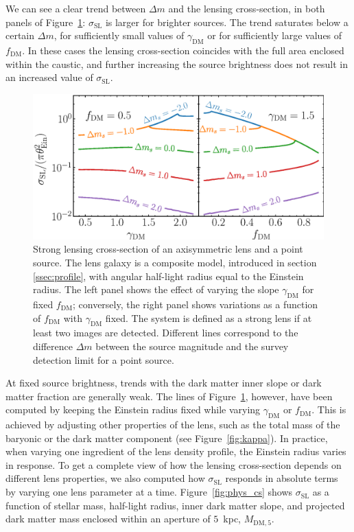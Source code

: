 \documentclass{aa}
\def\gammadm{\gamma_{\mathrm{DM}}}
\def\fdm{f_{\mathrm{DM}}}
\def\mdmfive{M_{\mathrm{DM}, 5}}
\def\crosssect{\sigma_\mathrm{{SL}}}
\def\Fref#1{Figure~\ref{#1}\xspace}
\begin{document}
We can see a clear trend between $\Delta m$ and the lensing cross-section, in both panels of \Fref{fig:fixedap_cs}: $\crosssect$ is larger for brighter sources.
The trend saturates below a certain $\Delta m$, for sufficiently small values of $\gammadm$ or for sufficiently large values of $\fdm$.
In these cases the lensing cross-section coincides with the full area enclosed within the caustic, and further increasing the source brightness does not result in an increased value of $\crosssect$.

\begin{figure}
\includegraphics[width=\columnwidth]{axisymm_composite_crosssect.eps}
\caption{
Strong lensing cross-section of an axisymmetric lens and a point source.
The lens galaxy is a composite model, introduced in section \ref{ssec:profile}, with angular half-light radius equal to the Einstein radius.
The left panel shows the effect of varying the slope $\gammadm$ for fixed $\fdm$; conversely, the right panel shows variations as a function of $\fdm$ with $\gammadm$ fixed.
The system is defined as a strong lens if at least two images are detected.
Different lines correspond to the difference $\Delta m$ between the source magnitude and the survey detection limit for a point source.
\label{fig:fixedap_cs}
}
\end{figure}

At fixed source brightness, trends with the dark matter inner slope or dark matter fraction are generally weak.
The lines of \Fref{fig:fixedap_cs}, however, have been computed by keeping the Einstein radius fixed while varying $\gammadm$ or $\fdm$.
This is achieved by adjusting other properties of the lens, such as the total mass of the baryonic or the dark matter component (see \Fref{fig:kappa}). 
In practice, when varying one ingredient of the lens density profile, the Einstein radius varies in response.
To get a complete view of how the lensing cross-section depends on different lens properties, we also computed how $\crosssect$ responds in absolute terms by varying one lens parameter at a time.
\Fref{fig:phys_cs} shows $\crosssect$ as a function of stellar mass, half-light radius, inner dark matter slope, and projected dark matter mass enclosed within an aperture of $5$~kpc, $\mdmfive$.
\end{document}
